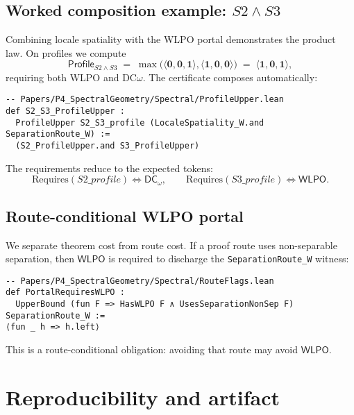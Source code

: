 \documentclass[11pt]{article}
\newcommand{\WLPO}{\mathsf{WLPO}}
\newcommand{\DCw}{\mathsf{DC}_{\omega}}
\newcommand{\hzero}{\mathbf{0}}
\newcommand{\hone}{\mathbf{1}}
\newcommand{\Profile}{\mathsf{Profile}}
\newcommand{\WLPOonly}{\langle \hone,\hzero,\hzero\rangle}
\newcommand{\DCwonly}{\langle \hzero,\hzero,\hone\rangle}
\newcommand{\lean}[1]{\texttt{#1}}
\theoremstyle{plain}
\theoremstyle{definition}
\theoremstyle{remark}
\begin{document}
\subsection{Worked composition example: \(S2 \wedge S3\)}
Combining locale spatiality with the WLPO portal demonstrates the product law.
On profiles we compute
\[
  \Profile_{S2 \wedge S3}
  \;=\; \max\!\big(\DCwonly,\WLPOonly\big)
  \;=\; \langle \hone,\hzero,\hone\rangle,
\]
requiring both WLPO and DC$\omega$. The certificate composes automatically:

\begin{lstlisting}
-- Papers/P4_SpectralGeometry/Spectral/ProfileUpper.lean
def S2_S3_ProfileUpper :
  ProfileUpper S2_S3_profile (LocaleSpatiality_W.and SeparationRoute_W) :=
  (S2_ProfileUpper.and S3_ProfileUpper)
\end{lstlisting}

The requirements reduce to the expected tokens:
\[
  \mathrm{Requires}(S2\_profile) \iff \DCw,\qquad
  \mathrm{Requires}(S3\_profile) \iff \WLPO.
\]

\subsection{Route-conditional WLPO portal}
We separate theorem cost from route cost. If a proof route uses non-separable
separation, then \(\WLPO\) is required to discharge the \lean{SeparationRoute\_W}
witness:

\begin{lstlisting}
-- Papers/P4_SpectralGeometry/Spectral/RouteFlags.lean
def PortalRequiresWLPO :
  UpperBound (fun F => HasWLPO F ∧ UsesSeparationNonSep F) SeparationRoute_W :=
⟨fun _ h => h.left⟩
\end{lstlisting}

This is a route-conditional obligation: avoiding that route may avoid \(\WLPO\).

\section{Reproducibility and artifact}
\end{document}
